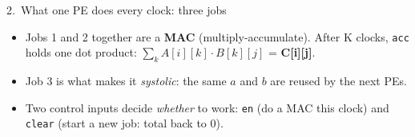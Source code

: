 \documentclass[aspectratio=169,11pt]{beamer}
\newcommand{\sig}[1]{\texttt{#1}}
\begin{document}
\begin{frame}{2.\ What one PE does every clock: three jobs}
  \centering
  \vspace{5mm}

  \raggedright\small
  \begin{itemize}
    \item Jobs 1 and 2 together are a \textbf{MAC} (multiply-accumulate). After K clocks, \sig{acc} holds
          one dot product: $\sum_k A[i][k]\cdot B[k][j]$ = \textbf{C[i][j]}.
    \item Job 3 is what makes it \emph{systolic}: the same $a$ and $b$ are reused by the next PEs.
    \item Two control inputs decide \emph{whether} to work:
          \sig{en} (do a MAC this clock) and \sig{clear} (start a new job: total back to 0).
  \end{itemize}
\end{frame}
\end{document}
